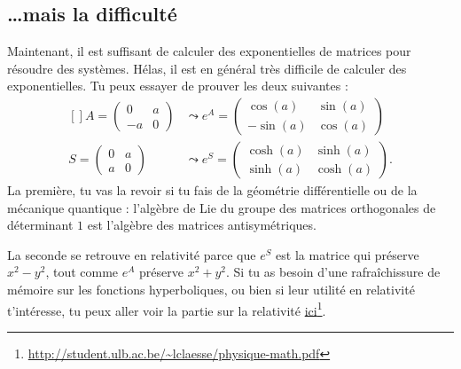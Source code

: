 					\subsection{\ldots mais la difficulté}

Maintenant, il est suffisant de calculer des exponentielles de matrices pour résoudre des systèmes. Hélas, il est en général très difficile de calculer des exponentielles. Tu peux essayer de prouver les deux suivantes :
\begin{equation}
	\begin{aligned}[]
		A=\begin{pmatrix}
	0	&	a	\\ 
	-a	&	0	
\end{pmatrix}	&\leadsto  e^{A}=\begin{pmatrix}
	\cos(a)	&	\sin(a)	\\ 
	-\sin(a)	&	\cos(a)	
\end{pmatrix}\\
		S=\begin{pmatrix}
	0	&	a	\\ 
	a	&	0	
\end{pmatrix}	&\leadsto  e^{S}=\begin{pmatrix}
	\cosh(a)	&	\sinh(a)	\\ 
	\sinh(a)	&	\cosh(a)	
\end{pmatrix}.
	\end{aligned}
\end{equation}
La première, tu vas la revoir si tu fais de la géométrie différentielle ou de la mécanique quantique : l'algèbre de Lie du groupe des matrices orthogonales de déterminant $1$ est l'algèbre des matrices antisymétriques.

La seconde se retrouve en relativité parce que $e^S$ est la matrice qui préserve $x^2-y^2$, tout comme $e^A$ préserve $x^2+y^2$. Si tu as besoin d'une rafraîchissure de mémoire sur les fonctions hyperboliques, ou bien si leur utilité en relativité t'intéresse, tu peux aller voir la partie sur la relativité \href{http://student.ulb.ac.be/~lclaesse/physique-math.pdf}{ici}\footnote{ \url{http://student.ulb.ac.be/~lclaesse/physique-math.pdf}}.

